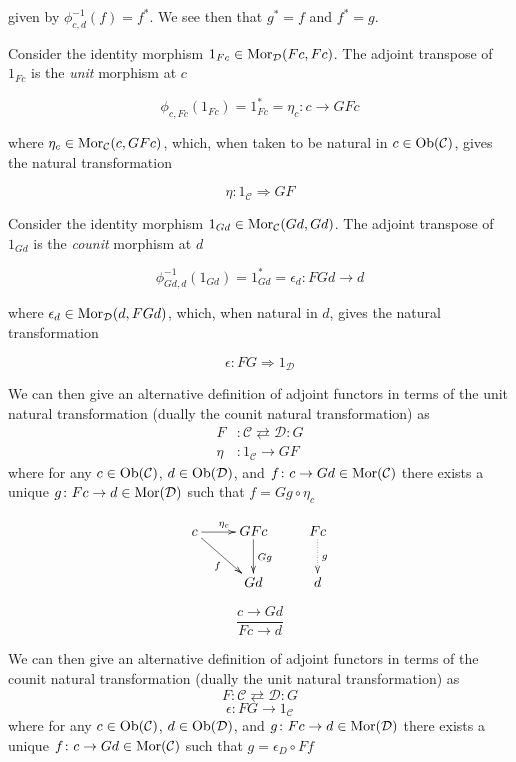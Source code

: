 \documentclass[aps,twocolumn]{revtex4-1}
\begin{document}
given by $\phi_{c,d}^{-1}(f) = f^*$. 
We see then that $g^* = f$ and $f^* = g$.

Consider the identity morphism $1_{Fc} \in \mathop{\rm Mor}\nolimits_{\mathcal{D}}(Fc,Fc)$. The adjoint transpose of $1_{Fc}$ is the {\it unit} morphism at $c$

$$
\phi_{c,Fc}(1_{Fc})=1_{Fc}^*=\eta_c: c \rightarrow GFc
$$

where $\eta_c \in \mathop{\rm Mor}\nolimits_{\mathcal{C}}(c,GFc)$, which, when taken to be natural in $c \in \mathop{\rm Ob}\nolimits(\mathcal{C})$, gives the natural transformation

$$
\eta : 1_{\mathcal{C}} \Rightarrow GF
$$

Consider the identity morphism $1_{Gd} \in \mathop{\rm Mor}\nolimits_{\mathcal{C}}(Gd,Gd)$. The adjoint transpose of $1_{Gd}$ is the {\it counit} morphism at $d$

$$
\phi_{Gd,d}^{-1}(1_{Gd})=1_{Gd}^*=\epsilon_d: FGd \rightarrow d
$$

where $\epsilon_d \in \mathop{\rm Mor}\nolimits_{\mathcal{D}}(d,FGd)$, which, when natural in $d$, gives the natural transformation

$$
\epsilon: FG \Rightarrow 1_{\mathcal{D}}
$$

We can then give an alternative definition of adjoint functors in terms of the unit natural transformation (dually the counit natural transformation) as
\begin{align*}
F & \colon \mathcal{C} \rightleftarrows \mathcal{D} \colon G\\
\eta & \colon 1_{\mathcal{C}} \rightarrow GF
\end{align*}
where for any $c \in \mathop{\rm Ob}\nolimits (\mathcal{C})$, $d \in \mathop{\rm Ob}\nolimits (\mathcal{D})$, and $f \colon c \rightarrow Gd \in \mathop{\rm Mor}\nolimits(\mathcal{C})$ there exists a unique $g \colon Fc \rightarrow d \in \mathop{\rm Mor}\nolimits(\mathcal{D})$ such that $f = Gg \circ \eta_c$				

		$$
					\xymatrix{
					c \ar[r]^{\eta_c} \ar[dr]_{f} & G F c \ar[d]^{G g} & F c \ar@{.>}[d]^{g}\\
					& G d & d}
		$$
	
		$$
			\frac{c \longrightarrow Gd}{Fc \longrightarrow d}
		$$
	
We can then give an alternative definition of adjoint functors in terms of the counit natural transformation (dually the unit natural transformation) as
$$
F \colon \mathcal{C} \rightleftarrows \mathcal{D} \colon G
$$
$$
\epsilon \colon FG \rightarrow 1_{\mathcal{C}}
$$
where for any $c \in \mathop{\rm Ob}\nolimits (\mathcal{C})$, $d \in \mathop{\rm Ob}\nolimits (\mathcal{D})$, and $g \colon Fc \rightarrow d \in \mathop{\rm Mor}\nolimits(\mathcal{D})$ there exists a unique $f \colon c \rightarrow Gd \in \mathop{\rm Mor}\nolimits(\mathcal{C})$ such that $g = \epsilon_D \circ Ff$	
\end{document}
